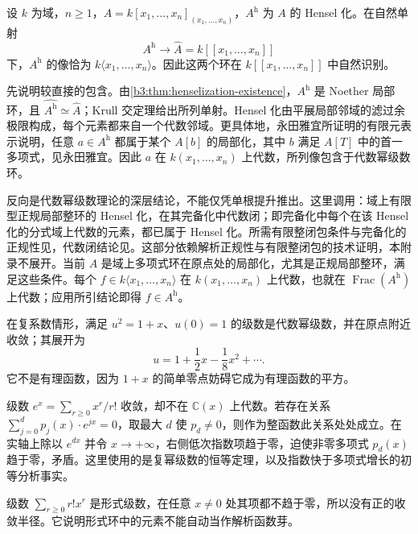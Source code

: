 \begin{proposition}\label{b3:prop:algebraic-series-henselization}
	设 \(k\) 为域，\(n\ge1\)，\(A=k[x_1,\ldots,x_n]_{(x_1,\ldots,x_n)}\)，\(A^{\mathrm h}\) 为 \(A\) 的 Hensel 化。在自然单射
	\[
		A^{\mathrm h}\longrightarrow\widehat A=k[\![x_1,\ldots,x_n]\!]
	\]
	下，\(A^{\mathrm h}\) 的像恰为 \(k\langle x_1,\ldots,x_n\rangle\)。因此这两个环在 \(k[\![x_1,\ldots,x_n]\!]\) 中自然识别。
\end{proposition}
\begin{proofsketch}
	先说明较直接的包含。由\cref{b3:thm:henselization-existence}，\(A^{\mathrm h}\) 是 Noether 局部环，且 \(\widehat{A^{\mathrm h}}\simeq\widehat A\)；Krull 交定理给出所列单射。Hensel 化由平展局部邻域的滤过余极限构成，每个元素都来自一个代数邻域。更具体地，永田雅宜所证明的有限元表示说明，任意 \(a\in A^{\mathrm h}\) 都属于某个 \(A[b]\) 的局部化，其中 \(b\) 满足 \(A[T]\) 中的首一多项式，见永田雅宜\cite[(43.9), p. 182]{Nagata1975LocalRings}。因此 \(a\) 在 \(k(x_1,\ldots,x_n)\) 上代数，所列像包含于代数幂级数环。

	反向是代数幂级数理论的深层结论，不能仅凭单根提升推出。这里调用：域上有限型正规局部整环的 Hensel 化，在其完备化中代数闭；即完备化中每个在该 Hensel 化的分式域上代数的元素，都已属于 Hensel 化。所需有限整闭包条件与完备化的正规性见\cite[(36.5), pp. 132--133; (37.5), pp. 138--139]{Nagata1975LocalRings}，代数闭结论见\cite[(44.3), p. 189]{Nagata1975LocalRings}。这部分依赖解析正规性与有限整闭包的技术证明，本附录不展开。当前 \(A\) 是域上多项式环在原点处的局部化，尤其是正规局部整环，满足这些条件。每个 \(f\in k\langle x_1,\ldots,x_n\rangle\) 在 \(k(x_1,\ldots,x_n)\) 上代数，也就在 \(\operatorname{Frac}(A^{\mathrm h})\) 上代数；应用所引结论即得 \(f\in A^{\mathrm h}\)。
\end{proofsketch}

\begin{example}\label{b3:exm:three-power-series}
	在复系数情形，满足 \(u^2=1+x\)、\(u(0)=1\) 的级数是代数幂级数，并在原点附近收敛；其展开为
	\[
		u=1+\frac12x-\frac18x^2+\cdots.
	\]
	它不是有理函数，因为 \(1+x\) 的简单零点妨碍它成为有理函数的平方。

	\ProseParagraphBreak
	级数 \(e^x=\sum_{r\ge0}x^r/r!\) 收敛，却不在 \(\mathbb C(x)\) 上代数。若存在关系 \(\sum_{j=0}^d p_j(x)\cdot e^{jx}=0\)，取最大 \(d\) 使 \(p_d\ne0\)，则作为整函数此关系处处成立。在实轴上除以 \(e^{dx}\) 并令 \(x\to+\infty\)，右侧低次指数项趋于零，迫使非零多项式 \(p_d(x)\) 趋于零，矛盾。这里使用的是复幂级数的恒等定理，以及指数快于多项式增长的初等分析事实。

	\ProseParagraphBreak
	级数 \(\sum_{r\ge0}r!x^r\) 是形式级数，在任意 \(x\ne0\) 处其项都不趋于零，所以没有正的收敛半径。它说明形式环中的元素不能自动当作解析函数芽。
\end{example}

